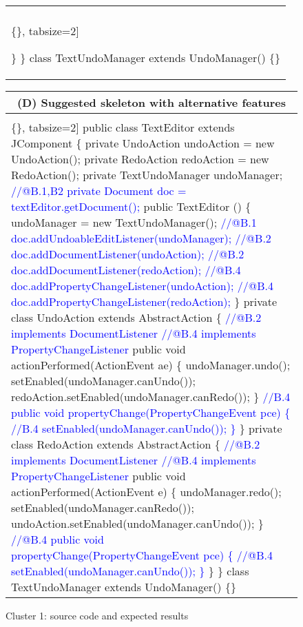 \begin{figure*}[!htb]
\begin{minipage}{0.5\textwidth}
\begin{tabular}{@{}p{}}
\begin{Verbatim}[commandchars=\\\{\}, tabsize=2]
   
   \}  \}
class TextUndoManager extends UndoManager() \{\}
  \end{Verbatim}
      \vspace{-4mm}
     \\ \hline
\end{tabular} 
\end{minipage}
\begin{minipage}{0.5\textwidth}
\scriptsize 
\begin{tabular}{@{}p{}} 
 \hline 
  \multicolumn{1}{c}{(D) Suggested skeleton with alternative features} \\ \hline
  \vspace{-4mm}
\begin{Verbatim}[commandchars=\\\{\}, tabsize=2]
public class TextEditor extends JComponent \{
    private UndoAction undoAction = new UndoAction();
    private RedoAction redoAction = new RedoAction();
    private TextUndoManager undoManager;
\textcolor{blue}{//@B.1,B2  private Document doc = textEditor.getDocument();}
   public TextEditor () \{
     undoManager = new TextUndoManager();
\textcolor{blue}{     //@B.1 doc.addUndoableEditListener(undoManager);}
\textcolor{blue}{     //@B.2 doc.addDocumentListener(undoAction);}
\textcolor{blue}{     //@B.2 doc.addDocumentListener(redoAction);}
\textcolor{blue}{     //@B.4 doc.addPropertyChangeListener(undoAction);}
\textcolor{blue}{     //@B.4 doc.addPropertyChangeListener(redoAction);}
  \}
 private class UndoAction extends AbstractAction \{
\textcolor{blue}{ //@B.2 implements DocumentListener}
\textcolor{blue}{ //@B.4 implements PropertyChangeListener}
  public void actionPerformed(ActionEvent ae) \{
    undoManager.undo();
    setEnabled(undoManager.canUndo());
    redoAction.setEnabled(undoManager.canRedo());
 \}
\textcolor{blue}{//B.4  public void propertyChange(PropertyChangeEvent pce) \{}
\textcolor{blue}{//B.4    setEnabled(undoManager.canUndo());  \} }
\}
  private class RedoAction extends AbstractAction \{ 
\textcolor{blue}{ //@B.2 implements DocumentListener}
\textcolor{blue}{ //@B.4 implements PropertyChangeListener}
  public void actionPerformed(ActionEvent e) \{
   undoManager.redo();
   setEnabled(undoManager.canRedo());
   undoAction.setEnabled(undoManager.canUndo());
  \} 
\textcolor{blue}{  //@B.4  public void propertyChange(PropertyChangeEvent pce) \{}
\textcolor{blue}{  //@B.4    setEnabled(undoManager.canUndo());  \} }
  \}  \}
  class TextUndoManager extends UndoManager() \{\}
  \end{Verbatim}
      \vspace{-4mm}
     \\ \hline
\end{tabular} 
\end{minipage}
\caption{Cluster 1: source code and expected results}
\label{fig:cluster1}
\end{figure*}

